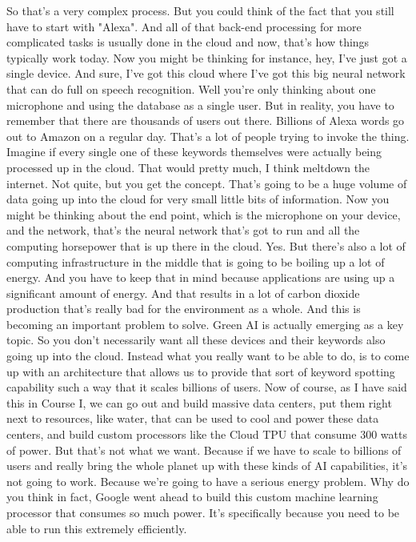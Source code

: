 So that's a very complex process.
But you could think of the fact that you still have to start with "Alexa".
And all of that back-end processing for more complicated tasks
is usually done in the cloud and now, that's how things typically work today.
Now you might be thinking for instance, hey, I've just got a single device.
And sure, I've got this cloud where I've got this big neural network that
can do full on speech recognition.
Well you're only thinking about one microphone
and using the database as a single user.
But in reality, you have to remember that there are thousands of users
out there.
Billions of Alexa words go out to Amazon on a regular day.
That's a lot of people trying to invoke the thing.
Imagine if every single one of these keywords themselves
were actually being processed up in the cloud.
That would pretty much, I think meltdown the internet.
Not quite, but you get the concept.
That's going to be a huge volume of data going up
into the cloud for very small little bits of information.
Now you might be thinking about the end point, which
is the microphone on your device, and the network, that's
the neural network that's got to run and all the computing horsepower that
is up there in the cloud.
Yes.
But there's also a lot of computing infrastructure
in the middle that is going to be boiling up a lot of energy.
And you have to keep that in mind because applications are using up
a significant amount of energy.
And that results in a lot of carbon dioxide production that's really
bad for the environment as a whole.
And this is becoming an important problem to solve.
Green AI is actually emerging as a key topic.
So you don't necessarily want all these devices and their keywords
also going up into the cloud.
Instead what you really want to be able to do,
is to come up with an architecture that allows
us to provide that sort of keyword spotting capability
such a way that it scales billions of users.
Now of course, as I have said this in Course I,
we can go out and build massive data centers,
put them right next to resources, like water,
that can be used to cool and power these data centers,
and build custom processors like the Cloud
TPU that consume 300 watts of power.
But that's not what we want.
Because if we have to scale to billions of users
and really bring the whole planet up with these kinds of AI capabilities,
it's not going to work.
Because we're going to have a serious energy problem.
Why do you think in fact, Google went ahead
to build this custom machine learning processor that consumes so much power.
It's specifically because you need to be able to run this extremely efficiently.
